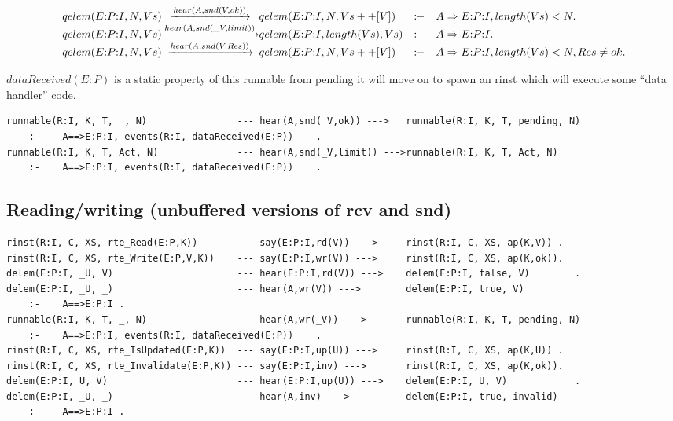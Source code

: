 \[
\begin{array}{r@{}c@{}lcl}
  \Preduce{qelem(E{:}P{:}I, N, Vs)}{hear(A,snd(V,ok))}{qelem(E{:}P{:}I, N, Vs++[V])}
    &\Pif &   A\Rightarrow{}E{:}P{:}I, length(Vs) < N.
\\\Preduce{qelem(E{:}P{:}I, N, Vs)}{hear(A,snd(\_V,limit))}{qelem(E{:}P{:}I, length(Vs), Vs)}
    &\Pif &   A\Rightarrow{}E{:}P{:}I    .
\\\Preduce{qelem(E{:}P{:}I, N, Vs)}{hear(A,snd(V,Res))}{qelem(E{:}P{:}I, N, Vs++[V])}
    &\Pif &   A\Rightarrow{}E{:}P{:}I, length(Vs) < N, Res \neq ok    .
\end{array}
\]

\(dataReceived(E{:}P)\) is a static property of this runnable
  from pending it will move on to spawn an rinst which will execute some ``data handler'' code.
\begin{verbatim}
runnable(R:I, K, T, _, N)                --- hear(A,snd(_V,ok)) --->   runnable(R:I, K, T, pending, N)
    :-    A==>E:P:I, events(R:I, dataReceived(E:P))    .
runnable(R:I, K, T, Act, N)              --- hear(A,snd(_V,limit)) --->runnable(R:I, K, T, Act, N)
    :-    A==>E:P:I, events(R:I, dataReceived(E:P))    .
\end{verbatim}

\subsection{Reading/writing (unbuffered versions of rcv and snd)}

\begin{verbatim}
rinst(R:I, C, XS, rte_Read(E:P,K))       --- say(E:P:I,rd(V)) --->     rinst(R:I, C, XS, ap(K,V)) .
rinst(R:I, C, XS, rte_Write(E:P,V,K))    --- say(E:P:I,wr(V)) --->     rinst(R:I, C, XS, ap(K,ok)).
delem(E:P:I, _U, V)                      --- hear(E:P:I,rd(V)) --->    delem(E:P:I, false, V)        .
delem(E:P:I, _U, _)                      --- hear(A,wr(V)) --->        delem(E:P:I, true, V)
    :-    A==>E:P:I .
runnable(R:I, K, T, _, N)                --- hear(A,wr(_V)) --->       runnable(R:I, K, T, pending, N)
    :-    A==>E:P:I, events(R:I, dataReceived(E:P))    .
rinst(R:I, C, XS, rte_IsUpdated(E:P,K))  --- say(E:P:I,up(U)) --->     rinst(R:I, C, XS, ap(K,U)) .
rinst(R:I, C, XS, rte_Invalidate(E:P,K)) --- say(E:P:I,inv) --->       rinst(R:I, C, XS, ap(K,ok)).
delem(E:P:I, U, V)                       --- hear(E:P:I,up(U)) --->    delem(E:P:I, U, V)            .
delem(E:P:I, _U, _)                      --- hear(A,inv) --->          delem(E:P:I, true, invalid)
    :-    A==>E:P:I .
\end{verbatim}

